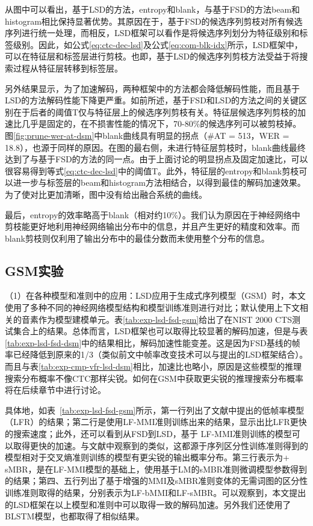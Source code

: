 从图中可以看出，基于LSD的方法，entropy和blank，与基于FSD的方法beam和histogram相比保持显著优势。其原因在于，基于FSD的候选序列剪枝对所有候选序列进行统一处理，而相反，LSD框架可以看作是将候选序列划分为特征级别和标签级别。因此，如公式\ref{eq:ctc-dec-lsd}及公式\ref{eq:com-blk-idx}所示，LSD框架中，可以在特征层和标签层进行剪枝。也即，基于LSD的候选序列剪枝方法受益于将搜索过程从特征层转移到标签层。

另外结果显示，为了加速解码，两种框架中的方法都会降低解码性能，而且基于LSD的方法解码性能下降更严重。如前所述，基于FSD和LSD的方法之间的关键区别在于后者的阈值T仅与特征层上的候选序列剪枝有关。特征层候选序列剪枝的加速比几乎是固定的，在不损害性能的情况下，70-80\%的候选序列可以被剪枝掉。图\ref{fig:prune-wer-at-dsm}中blank曲线具有明显的拐点（\#AT = 513，WER = 18.8），也源于同样的原因。在图的最右侧，未进行特征层剪枝时，blank曲线最终达到了与基于FSD的方法的同一点。由于上面讨论的明显拐点及固定加速比，可以很容易得到等式\ref{eq:ctc-dec-lsd}中的阈值T。此外，特征层的entropy和blank剪枝可以进一步与标签层的beam和histogram方法相结合，以得到最佳的解码加速效果。为了使对比更加清晰，图中没有给出融合系统的曲线。

最后，entropy的效率略高于blank（相对约10\%）。我们认为原因在于神经网络中剪枝能更好地利用神经网络输出分布中的信息，并且产生更好的精度和效率。而blank剪枝则仅利用了输出分布中的最佳分数而未使用整个分布的信息。

\subsection{GSM实验}
\label{exp:gsm}
（1）在各种模型和准则中的应用：LSD应用于生成式序列模型（GSM）时，本文使用了多种不同的神经网络模型结构和模型训练准则进行对比；默认使用上下文相关的音素作为模型建模单元。表\ref{tab:exp-lsd-fsd-gsm}给出了在NIST 2000 CTS测试集合上的结果。总体而言，LSD框架也可以取得比较显著的解码加速，但是与表\ref{tab:exp-lsd-fsd-dsm}中的结果相比，解码加速性能变差。这是因为FSD基线的帧率已经降低到原来的1/3\cite{pundak2016lower}（类似前文中帧率改变技术可以与提出的LSD框架结合）。而且与表\ref{tab:exp-cmp-vfr-lsd-dsm}相比，加速比也略小，原因是这些模型的推理搜索分布概率不像CTC那样尖锐。如何在GSM中获取更尖锐的推理搜索分布概率将在后续章节中进行讨论。

具体地，如表~\ref{tab:exp-lsd-fsd-gsm}所示，第一行列出了文献\cite{pundak2016lower}中提出的低帧率模型（LFR）的结果；第二行是使用LF-MMI准则\cite{povey2016purely}训练出来的结果，显示出比LFR更快的搜索速度；此外，还可以看到从FSD到LSD，基于 LF-MMI准则训练的模型可以取得更快的加速。与文献\cite{paulik2015improvements}中观察到的类似，这都源于序列区分性训练准则得到的模型相对于交叉熵准则训练的模型有更尖锐的输出概率分布。第三行表示为+ sMBR，是在LF-MMI模型的基础上，使用基于LM的sMBR准则微调模型参数得到的结果；第四、五行列出了基于增强的MMI\cite{povey2008boosted}及sMBR准则变体的无需词图的区分性训练准则取得的结果，分别表示为LF-bMMI和LF-sMBR。可以观察到，本文提出的LSD框架在以上模型和准则中可以取得一致的解码加速。另外我们还使用了BLSTM模型，也都取得了相似结果。


